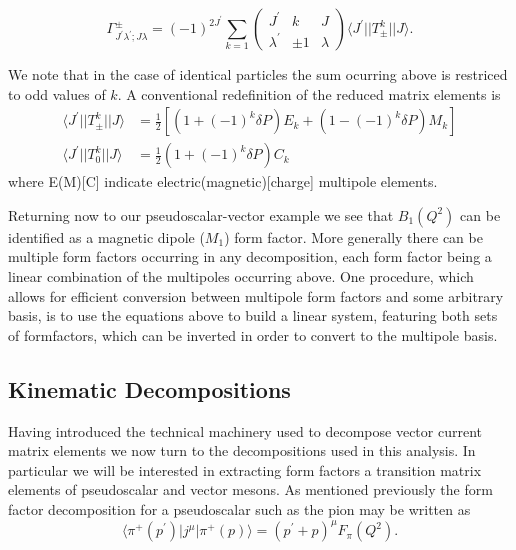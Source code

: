 \begin{equation}
 \Gamma_{J^\prime\lambda^\prime;J\lambda}^\pm = \left(-1\right)^{2J^\prime} \sum_{k=1}
  \begin{pmatrix} J^\prime & k & J \\
 \lambda^\prime & \pm 1 & \lambda  \end{pmatrix} 
 \langle J^\prime || T^k_\pm || J \rangle  .
\end{equation}

We note that in the case of identical particles the sum ocurring above is restriced to odd values of $k$. A conventional redefinition of the reduced matrix elements is 
\begin{align*}
 \langle J^\prime || T^k_\pm || J \rangle &= \frac{1}{2}\left[ \left(1 + (-1)^k\delta P\right)E_k + \left(1 - (-1)^k \delta P \right)  M_k  \right] \\
  \langle J^\prime || T^k_0 || J \rangle &= \frac{1}{2} \left(1 + (-1)^k\delta P\right)C_k 
\end{align*} 
where E(M)[C] indicate electric(magnetic)[charge] multipole elements.  

Returning now to our pseudoscalar-vector example we see that $B_1(Q^2)$ can be identified as a magnetic dipole ($M_1$) form factor. More generally there can be multiple form factors occurring in any decomposition, each form factor being a linear combination of the multipoles occurring above. One procedure, which allows for efficient conversion between multipole form factors and some arbitrary basis, is to use the equations above to build a linear system, featuring both sets of formfactors, which can be inverted in order to convert to the multipole basis. 

\subsection{Kinematic Decompositions}

Having introduced the technical machinery used to decompose vector current matrix elements we now turn to the decompositions used in this analysis. In particular we will be interested in extracting form factors a transition matrix elements of pseudoscalar and vector mesons. As mentioned previously the form factor decomposition for a pseudoscalar such as the pion may be written as
\begin{equation} \label{eqn::pion_decomp}
\langle \pi^+ (p^\prime) | j^\mu | \pi^+ (p) \rangle = \left( p^\prime + p\right)^\mu F_\pi(Q^2).
\end{equation}

